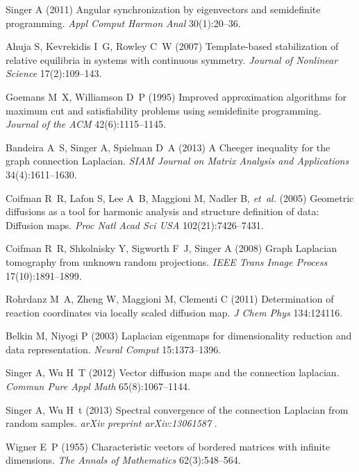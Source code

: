 \documentclass{pnastwo}
\begin{document}
\begin{article}
\begin{thebibliography}{10}

Singer A (2011) Angular synchronization by eigenvectors and semidefinite
  programming. \textit{Appl Comput Harmon Anal}
  30(1):20--36.

Ahuja S, Kevrekidis I~G, Rowley C~W (2007) Template-based stabilization of
  relative equilibria in systems with continuous symmetry. \textit{Journal of
  Nonlinear Science} 17(2):109--143.

Goemans M~X, Williamson D~P (1995) Improved approximation algorithms for maximum cut and satisfiability problems using semidefinite programming.
\textit{Journal of the ACM} 42(6):1115--1145.

Bandeira A~S, Singer A, Spielman D~A (2013) A Cheeger inequality for the graph connection Laplacian. \textit{SIAM Journal on Matrix Analysis and Applications} 34(4):1611--1630.

Coifman R~R, Lafon S, Lee A~B, Maggioni M, Nadler B, \textit{et~al.} (2005)
  Geometric diffusions as a tool for harmonic analysis and structure definition
  of data: Diffusion maps. \textit{Proc Natl Acad Sci USA} 102(21):7426--7431.

Coifman R~R, Shkolnisky Y, Sigworth F~J, Singer A (2008) Graph {L}aplacian
  tomography from unknown random projections. \textit{IEEE Trans Image Process} 17(10):1891--1899.

Rohrdanz M~A, Zheng W, Maggioni M, Clementi C (2011) Determination of reaction
  coordinates via locally scaled diffusion map. \textit{J Chem Phys} 134:124116.

Belkin M, Niyogi P (2003) Laplacian eigenmaps for dimensionality reduction and
  data representation. \textit{Neural Comput} 15:1373--1396.

Singer A, Wu H~T (2012) Vector diffusion maps and the connection laplacian.
  \textit{Commun Pure Appl Math} 65(8):1067--1144.

Singer A, Wu H~t (2013) Spectral convergence of the connection {L}aplacian from
  random samples. \textit{arXiv preprint arXiv:13061587} .

Wigner E~P (1955) Characteristic vectors of bordered matrices with infinite
  dimensions. \textit{The Annals of Mathematics} 62(3):548--564.


\end{thebibliography}
\end{article}
\end{document}
